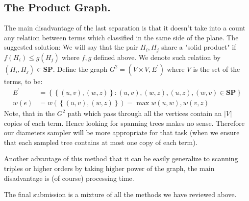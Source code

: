 \documentclass{article}
\begin{document}
\begin{multicols*}{2}
\section{The Product Graph.}
The main disadvantage of the last separation is that it doesn't take into a count any relation between terms which classified in the same side of the plane. The suggested solution: We will say that the pair \(H_i, H_j\) share a "solid product" if  \( f\left(H_{i}\right) \le g \left(H_{j}\right) \) where \(f,g\) defined above. We denote such relation by \(\left(H_i, H_j\right) \in \textbf{SP} \). Define the graph \(G^2 = \left(V\times V , E^{\prime}\right)\) where \(V\) is the set of the terms, to be: 
\begin{equation*}
    \begin{split}
        E^{\prime} &= \left\{ \left\{ (u,v),(w,z) \right\} : (u,v),(w,z),(u,z),(w,v) \in \textbf{SP} \right\}  \\
        w(e) &= w\left( \left\{ (u,v),(w,z) \right\} \right) = \max { w(u,w),w(v,z) }
    \end{split}
\end{equation*}
Note, that in the \(G^2\) path which pass through all the vertices contain an \(|V|\) copies of each term. Hence looking for spanning trees makes no sense. Therefore our diameters sampler will be more appropriate for that task (when we ensure that each sampled tree contains at most one copy of each term).          

Another advantage of this method that it can be easily generalize to scanning triples or higher orders by taking higher power of the graph, the main disadvantage is (of course) processing time.       

The final submission is a mixture of all the methods we have reviewed above.   

\printbibliography 
\end{multicols*}


\end{document}
